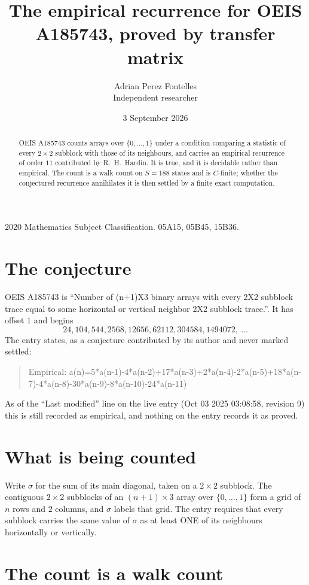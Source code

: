\documentclass[11pt,a4paper]{article}
\title{The empirical recurrence for OEIS A185743, proved by transfer matrix}
\author{Adrian Perez Fontelles\\ \small Independent researcher}
\date{3 September 2026}
\theoremstyle{plain}
\theoremstyle{definition}
\begin{document}
\maketitle

\begin{abstract}
OEIS A185743 counts arrays over $\{0,\dots,1\}$ under a condition comparing a statistic of
every $2\times2$ subblock with those of its neighbours, and carries an empirical recurrence
of order $11$ contributed by R.~H.~Hardin. It is true, and it is decidable rather than
empirical. The count is a walk count on $S=188$ states and is $C$-finite; whether the
conjectured recurrence annihilates it is then settled by a finite exact computation.
\end{abstract}

\noindent\small 2020 Mathematics Subject Classification. 05A15, 05B45, 15B36.\normalsize

\section{The conjecture}

OEIS A185743 is ``Number of (n+1)X3 binary arrays with every 2X2 subblock trace equal to some horizontal or vertical neighbor 2X2 subblock trace.''. It has offset $1$ and begins
\[
24, 104, 544, 2568, 12656, 62112, 304584, 1494072,\ \dots
\]
The entry states, as a conjecture contributed by its author and never marked settled:
\begin{quote}
Empirical: a(n)=5*a(n-1)-4*a(n-2)+17*a(n-3)+2*a(n-4)-2*a(n-5)+18*a(n-7)-4*a(n-8)-30*a(n-9)-8*a(n-10)-24*a(n-11)
\end{quote}
As of the ``Last modified'' line on the live entry (Oct 03 2025 03:08:58, revision 9) this is still
recorded as empirical, and nothing on the entry records it as proved.

\section{What is being counted}

Write $\sigma$ for the sum of its main diagonal, taken on a $2\times2$ subblock. The contiguous $2\times2$
subblocks of an $(n+1)\times3$ array over $\{0,\dots,1\}$ form a grid of $n$ rows
and $2$ columns, and $\sigma$ labels that grid. The entry
requires that every subblock carries the same value of $\sigma$ as at least ONE of its neighbours horizontally or vertically.

\section{The count is a walk count}
\end{document}
